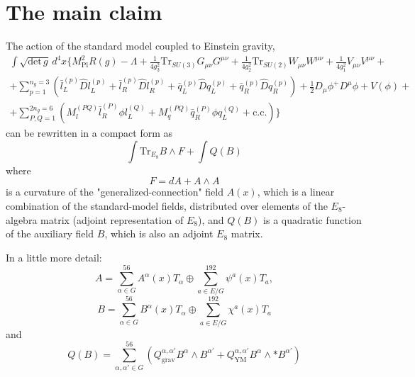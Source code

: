 \documentclass{article}
\begin{document}
\section{The main claim}
The action of the standard model coupled to Einstein gravity,
\begin{multline}
    \int \sqrt{\text{det}\, g} \, d^4x \{ M_{\text{Pl}}^2 R(g) - \Lambda + \frac{1}{4g_3^2} \text{Tr}_{SU(3)} G_{\mu\nu} G^{\mu\nu} + \frac{1}{4g_2^2} \text{Tr}_{SU(2)} W_{\mu\nu} W^{\mu\nu} + \frac{1}{4g_1^2} V_{\mu\nu} V^{\mu\nu} + \\ + \sum_{p=1}^{n_g=3} \left( \bar{l}^{(p)}_L \hat{D} l^{(p)}_L + \bar{l}^{(p)}_R \hat{D} l^{(p)}_R + \bar{q}^{(p)}_L \hat{D} q^{(p)}_L + \bar{q}^{(p)}_R \hat{D} q^{(p)}_R \right) + \frac{1}{2} D_\mu \phi^+ D^\mu \phi + V(\phi) + 
    \\ + \sum_{P,Q=1}^{2n_g=6} \left( M^{(PQ)}_l \bar{l}^{(P)}_R \phi l^{(Q)}_L + M^{(PQ)}_q \bar{q}^{(P)}_R \phi q^{(Q)}_L + \text{c.c.} \right) \}
\end{multline}
can be rewritten in a compact form as
\begin{equation}
    \int \text{Tr}_{E_8} B \wedge F + \int Q(B)
\end{equation}
where
\begin{equation}
    F = dA + A \wedge A
\end{equation}
is a curvature of the "generalized-connection" field $A(x)$, which is a linear combination of the standard-model fields, distributed over elements of the $E_8$-algebra matrix (adjoint representation of $E_8$), and $Q(B)$ is a quadratic function of the auxiliary field $B$, which is also an adjoint $E_8$ matrix.

In a little more detail:
\begin{equation}
    A = \sum_{\alpha \in G}^{56} A^\alpha(x) T_\alpha \oplus \sum_{a \in E/G}^{192} \psi^a(x) T_a,
\end{equation}
\begin{equation}
    B = \sum_{\alpha \in G}^{56} B^\alpha(x) T_\alpha \oplus \sum_{a \in E/G}^{192} \chi^a(x) T_a
\end{equation}
and
\begin{equation}
    Q(B) = \sum_{\alpha, \alpha' \in G}^{56} \left( Q_{\text{grav}}^{\alpha, \alpha'} B^\alpha \wedge B^{\alpha'} + Q_{\text{YM}}^{\alpha, \alpha'} B^\alpha \wedge *B^{\alpha'} \right)
\end{equation}
\end{document}
